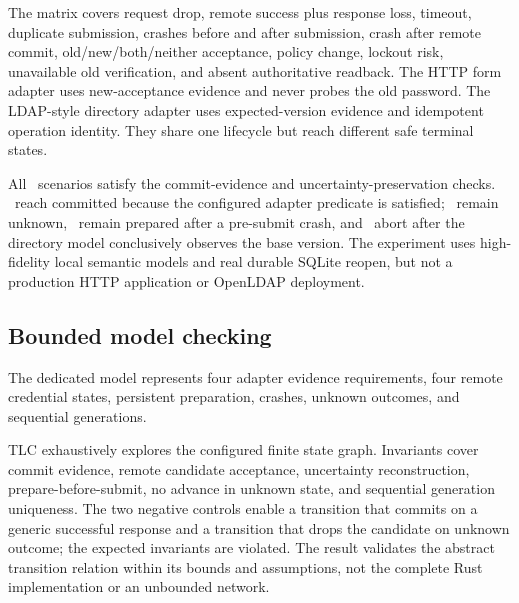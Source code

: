 \documentclass[preprint,12pt]{elsarticle}
\begin{document}
\begin{table}[t]
\centering
\caption{Fault matrix across two adapter semantics.}
\label{tab:rotation}

\end{table}

The matrix covers request drop, remote success plus response loss, timeout,
duplicate submission, crashes before and after submission, crash after remote
commit, old/new/both/neither acceptance, policy change, lockout risk, unavailable
old verification, and absent authoritative readback. The HTTP form adapter uses
new-acceptance evidence and never probes the old password. The LDAP-style
directory adapter uses expected-version evidence and idempotent operation
identity. They share one lifecycle but reach different safe terminal states.

All \RotationCases\ scenarios satisfy the commit-evidence and uncertainty-preservation
checks. \RotationCommitted\ reach committed because the configured adapter
predicate is satisfied; \RotationUnknown\ remain unknown,
\RotationPrepared\ remain prepared after a pre-submit crash, and
\RotationAborted\ abort after the directory model conclusively observes the base version.
The experiment uses high-fidelity local semantic models and real durable SQLite
reopen, but not a production HTTP application or OpenLDAP deployment.

\subsection{Bounded model checking}

The dedicated model represents four adapter evidence requirements, four remote
credential states, persistent preparation, crashes, unknown outcomes, and
sequential generations.

\begin{table}[t]
\centering
\caption{TLC results for the EPSCD rotation abstraction.}
\label{tab:tla}

\end{table}

TLC exhaustively explores the configured finite state graph. Invariants cover
commit evidence, remote candidate acceptance, uncertainty reconstruction,
prepare-before-submit, no advance in unknown state, and sequential generation
uniqueness. The two negative controls enable a transition that commits on a
generic successful response and a transition that drops the candidate on
unknown outcome; the expected invariants are violated. The result validates
the abstract transition relation within its bounds and assumptions, not the
complete Rust implementation or an unbounded network.
\end{document}
